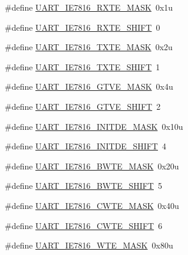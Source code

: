 \begin{DoxyCompactItemize}
\item 
\#define \hyperlink{group___u_a_r_t___register___masks_gad8d954bf21c5ed93f49c9418f0b1bc5e}{U\+A\+R\+T\+\_\+\+I\+E7816\+\_\+\+R\+X\+T\+E\+\_\+\+M\+A\+SK}~0x1u
\item 
\#define \hyperlink{group___u_a_r_t___register___masks_ga0df3e70bd53348388872ae57a8f7f156}{U\+A\+R\+T\+\_\+\+I\+E7816\+\_\+\+R\+X\+T\+E\+\_\+\+S\+H\+I\+FT}~0
\item 
\#define \hyperlink{group___u_a_r_t___register___masks_ga5968d2ee914444772fe2e6fa65ca848b}{U\+A\+R\+T\+\_\+\+I\+E7816\+\_\+\+T\+X\+T\+E\+\_\+\+M\+A\+SK}~0x2u
\item 
\#define \hyperlink{group___u_a_r_t___register___masks_gad0266a63ef5e0bb5dfaa2c87c2a1639e}{U\+A\+R\+T\+\_\+\+I\+E7816\+\_\+\+T\+X\+T\+E\+\_\+\+S\+H\+I\+FT}~1
\item 
\#define \hyperlink{group___u_a_r_t___register___masks_ga64b8f696aa038e3a27d743e024632e7d}{U\+A\+R\+T\+\_\+\+I\+E7816\+\_\+\+G\+T\+V\+E\+\_\+\+M\+A\+SK}~0x4u
\item 
\#define \hyperlink{group___u_a_r_t___register___masks_ga92681ae737e84944e46e525a831303b9}{U\+A\+R\+T\+\_\+\+I\+E7816\+\_\+\+G\+T\+V\+E\+\_\+\+S\+H\+I\+FT}~2
\item 
\#define \hyperlink{group___u_a_r_t___register___masks_ga6e0fc67109bbfda4ecffbb29a7bdcac7}{U\+A\+R\+T\+\_\+\+I\+E7816\+\_\+\+I\+N\+I\+T\+D\+E\+\_\+\+M\+A\+SK}~0x10u
\item 
\#define \hyperlink{group___u_a_r_t___register___masks_ga92e0d4cc206532c7e058e7b0eae64492}{U\+A\+R\+T\+\_\+\+I\+E7816\+\_\+\+I\+N\+I\+T\+D\+E\+\_\+\+S\+H\+I\+FT}~4
\item 
\#define \hyperlink{group___u_a_r_t___register___masks_ga1c4d8cb11c43f38d1d2254ae85517aa0}{U\+A\+R\+T\+\_\+\+I\+E7816\+\_\+\+B\+W\+T\+E\+\_\+\+M\+A\+SK}~0x20u
\item 
\#define \hyperlink{group___u_a_r_t___register___masks_ga9836d1c354b24274e92d300009b0b416}{U\+A\+R\+T\+\_\+\+I\+E7816\+\_\+\+B\+W\+T\+E\+\_\+\+S\+H\+I\+FT}~5
\item 
\#define \hyperlink{group___u_a_r_t___register___masks_ga9722a9d0abe861759ebfce9a874790d7}{U\+A\+R\+T\+\_\+\+I\+E7816\+\_\+\+C\+W\+T\+E\+\_\+\+M\+A\+SK}~0x40u
\item 
\#define \hyperlink{group___u_a_r_t___register___masks_gae0328d827cea2e36c9e0f47a2dd8254d}{U\+A\+R\+T\+\_\+\+I\+E7816\+\_\+\+C\+W\+T\+E\+\_\+\+S\+H\+I\+FT}~6
\item 
\#define \hyperlink{group___u_a_r_t___register___masks_ga65824b38972042fd8ddaa1b7a5b7cf98}{U\+A\+R\+T\+\_\+\+I\+E7816\+\_\+\+W\+T\+E\+\_\+\+M\+A\+SK}~0x80u

\end{DoxyCompactItemize}
